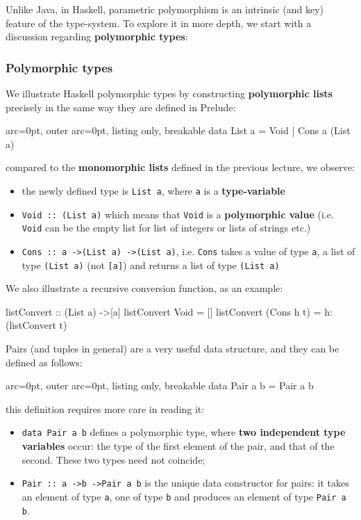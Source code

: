 Unlike Java, in Haskell, parametric polymorphism is an intrinsic (and key) feature of the type-system. To explore it in more depth, we start with a discussion regarding \textbf{polymorphic types}:

\subsubsection*{ Polymorphic types }

We illustrate Haskell polymorphic types by constructing \textbf{polymorphic lists} precisely in the same way they are defined in Prelude:


\begin{tcblisting}{ arc=0pt, outer arc=0pt, listing only, breakable}
data List a = Void | Cons a (List a)

\end{tcblisting}


compared to the \textbf{monomorphic lists} defined in the previous lecture, we observe:
\begin{itemize}
	\item  the newly defined type is \texttt{List a}, where \texttt{a} is a \textbf{type-variable}
	\item  \texttt{Void :: (List a)} which means that \texttt{Void} is a \textbf{polymorphic value} (i.e. \texttt{Void} can be the empty list for list of integers or lists of strings etc.)
	\item  \texttt{Cons :: a -\textgreater  (List a) -\textgreater  (List a)}, i.e. \texttt{Cons} takes a value of type \texttt{a}, a list of type \texttt{(List a)} (not \texttt{[a]}) and returns a list of type \texttt{(List a)}
\end{itemize}

We also illustrate a recursive conversion function, as an example:

listConvert :: (List a) -\textgreater  [a]
listConvert Void = []
listConvert (Cons h t) = h:(listConvert t)

Pairs (and tuples in general) are a very useful data structure, and they can be defined as follows:


\begin{tcblisting}{ arc=0pt, outer arc=0pt, listing only, breakable}
data Pair a b = Pair a b

\end{tcblisting}


this definition requires more care in reading it:
\begin{itemize}
	\item  \texttt{data Pair a b} defines a polymorphic type, where \textbf{two independent type variables} occur: the type of the first element of the pair, and that of the second. These two types need not coincide;
	\item  \texttt{Pair :: a -\textgreater  b -\textgreater  Pair a b} is the unique data constructor for pairs: it takes an element of type \texttt{a}, one of type \texttt{b} and produces an element of type \texttt{Pair a b}.
\end{itemize}

